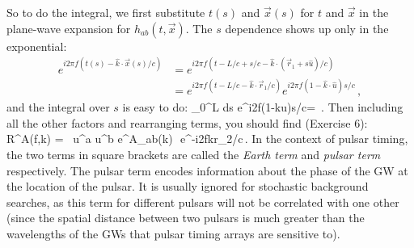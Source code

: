 So to do the integral, we first substitute $t(s)$ and 
$\vec x(s)$ for $t$ and $\vec x$ in the plane-wave 
expansion for $h_{ab}(t,\vec x)$.
The $s$ dependence shows up only in the exponential:
%
\begin{equation}
\begin{aligned}
e^{i2\pi f(t(s)-\hat k\cdot\vec x(s)/c)}
&= e^{i2\pi f(t-L/c + s/c -\hat k\cdot(\vec r_1 + s\hat u)/c)}
\\
&= e^{i2\pi f(t-L/c -\hat k\cdot\vec r_1/c)}
e^{i2\pi f(1 -\hat k\cdot\hat u)s/c}\,,
\end{aligned}
\end{equation}
%
and the integral over $s$ is easy to do:
%
\be
\int_0^L {\rm d}s\>
e^{i2\pi f(1-\hat k\cdot\hat u)s/c}=
\,.
\ee
Then including all the other factors and rearranging terms, 
you should find (Exercise 6):
%
\be
R^A(f,\hat k) = \,
u^a u^b e^A_{ab}(\hat k)\,
\,e^{-i2\pi f\hat k\cdot\vec r_2/c}\,.
\label{e:response_one_arm_one_way}
\ee
%
In the context of pulsar timing, the two terms in square brackets 
are called the {\em Earth term} and {\em pulsar term} respectively.
The pulsar term encodes information about the phase of the GW at
the location of the pulsar.
It is usually ignored for stochastic background searches, as 
this term for different pulsars will not be correlated with one other
(since the spatial distance between two pulsars is much greater than
the wavelengths of the GWs that pulsar timing arrays are 
sensitive to).

